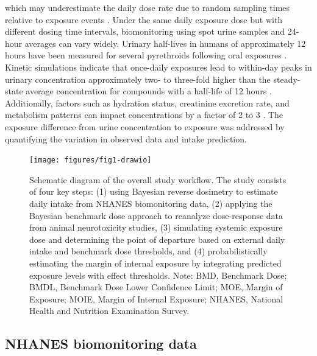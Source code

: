 \documentclass[toxics,article,submit,pdftex,moreauthors]{Definitions/mdpi}
\begin{document}
\begin{itemize}
  which may underestimate the daily dose rate due to random sampling
  times relative to exposure events \citep{aylward_interpreting_2012}.
  Under the same daily exposure dose but with different dosing time
  intervals, biomonitoring using spot urine samples and 24-hour averages
  can vary widely. Urinary half-lives in humans of approximately 12
  hours have been measured for several pyrethroids following oral
  exposures \citep{leng1997biological, woollen_metabolism_1992}. Kinetic
  simulations indicate that once-daily exposures lead to within-day
  peaks in urinary concentration approximately two- to three-fold higher
  than the steady-state average concentration for compounds with a
  half-life of 12 hours \citep{aylward_screening_level_2018}.
  Additionally, factors such as hydration status, creatinine excretion
  rate, and metabolism patterns can impact concentrations by a factor of
  2 to 3 \citep{scher2007agreement}. The exposure difference from urine
  concentration to exposure was addressed by quantifying the variation
  in observed data and intake prediction.
\end{itemize}

\begin{figure}[H]
\centering
\begin{adjustwidth}{-4cm}{}
\centering
\texttt{[image: figures/fig1-drawio]}
\hfill
\end{adjustwidth}
\caption{Schematic diagram of the overall study workflow. The study consists of 
four key steps: (1) using Bayesian reverse dosimetry to estimate daily intake from 
NHANES biomonitoring data, (2) applying 
the Bayesian benchmark dose approach to reanalyze dose-response data from animal 
neurotoxicity studies, (3) simulating systemic exposure dose and determining the 
point of departure based on external daily intake and benchmark dose thresholds, 
and (4) probabilistically estimating the margin of internal exposure by integrating 
predicted exposure levels with effect thresholds. Note: BMD, Benchmark Dose; BMDL, Benchmark Dose Lower Confidence Limit; MOE, Margin of Exposure; MOIE, Margin of Internal Exposure; NHANES, National Health and Nutrition Examination Survey.\label{fig1}}
\end{figure}


\subsection{NHANES biomonitoring data}\label{nhanes-biomonitoring-data}
\end{document}
